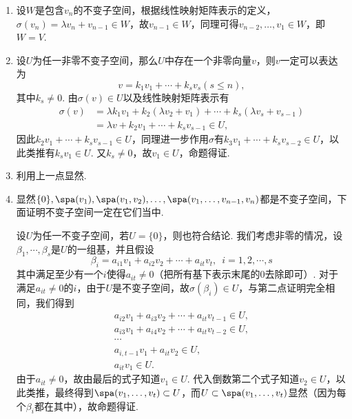 \begin{solution}
    \begin{enumerate}
        \item 设$W$是包含$v_n$的不变子空间，根据线性映射矩阵表示的定义，$\sigma(v_n)=\lambda v_n+v_{n-1}\in W$，故$v_{n-1}\in W$，同理可得$v_{n-2},\ldots,v_1\in W$，即$W=V$.

        \item 设$U$为任一非零不变子空间，那么$U$中存在一个非零向量$v$，则$v$一定可以表达为
        \[v=k_1v_1+\cdots+k_sv_s(s\leqslant n),\]
        其中$k_s\neq 0$. 由$\sigma(v)\in U$以及线性映射矩阵表示有
        \begin{align*}
            \sigma(v) &= \lambda k_1v_1+k_2(\lambda v_2+v_1)+\cdots+k_s(\lambda v_s+v_{s-1}) \\
            &= \lambda v+k_2v_1+\cdots+k_sv_{s-1}\in U,
        \end{align*}
        因此$k_2v_1+\cdots+k_sv_{s-1}\in U$，同理进一步作用$\sigma$有$k_3v_1+\cdots+k_sv_{s-2}\in U$，以此类推有$k_sv_1\in U$. 又$k_s\neq 0$，故$v_1\in U$，命题得证.

        \item 利用上一点显然.

        \item 显然$\{0\},\spa(v_1),\spa(v_1,v_2),\ldots,\spa(v_1,\ldots,v_{n-1},v_n)$都是不变子空间，下面证明不变子空间一定在它们当中.

        设$U$为任一不变子空间，若$U=\{0\}$，则也符合结论. 我们考虑非零的情况，设$\beta_1,\cdots,\beta_s$是$U$的一组基，并且假设
        \[\beta_i=a_{i1}v_1+a_{i2}v_2+\cdots+a_{it}v_t,\enspace i=1,2,\cdots,s\]
        其中满足至少有一个$i$使得$a_{it}\neq 0$（把所有基下表示末尾的0去除即可）. 对于满足$a_{it}\neq 0$的$i$，由于$U$是不变子空间，故$\sigma(\beta_i)\in U$，与第二点证明完全相同，我们得到
        \begin{align*}
            a_{i2}v_1+a_{i3}v_2+\cdots+a_{it}v_{t-1}\in U, \\
            a_{i3}v_1+a_{i4}v_2+\cdots+a_{it}v_{t-2}\in U, \\
            \cdots \\
            a_{i,t-1}v_1+a_{it}v_2\in U, \\
            a_{it}v_1\in U.
        \end{align*}
        由于$a_{it}\neq 0$，故由最后的式子知道$v_1\in U$. 代入倒数第二个式子知道$v_2\in U$，以此类推，最终得到$\spa(v_1,\ldots,v_t)\subset U$，而$U\subset\spa(v_1,\ldots,v_t)$显然（因为每个$\beta_i$都在其中），故命题得证.
    \end{enumerate}
\end{solution}

